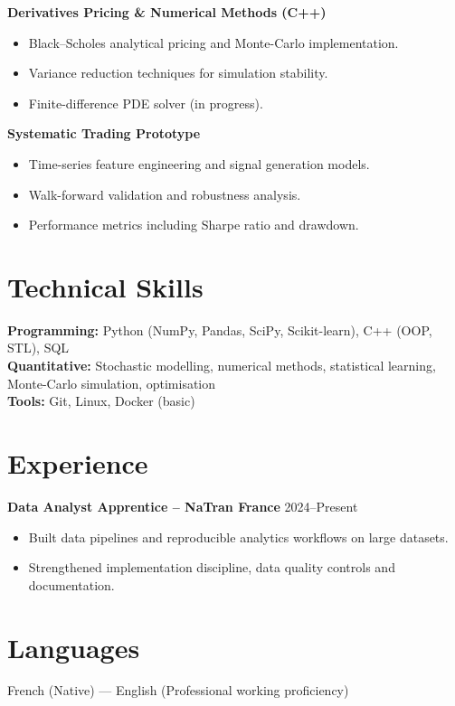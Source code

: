 \documentclass[10pt, letterpaper]{article}
\begin{document}
\textbf{Derivatives Pricing \& Numerical Methods (C++)}
\begin{itemize}[leftmargin=0.5cm]
\item Black--Scholes analytical pricing and Monte-Carlo implementation.
\item Variance reduction techniques for simulation stability.
\item Finite-difference PDE solver (in progress).
\end{itemize}

\textbf{Systematic Trading Prototype}
\begin{itemize}[leftmargin=0.5cm]
\item Time-series feature engineering and signal generation models.
\item Walk-forward validation and robustness analysis.
\item Performance metrics including Sharpe ratio and drawdown.
\end{itemize}

\section*{Technical Skills}
\textbf{Programming:} Python (NumPy, Pandas, SciPy, Scikit-learn), C++ (OOP, STL), SQL\\
\textbf{Quantitative:} Stochastic modelling, numerical methods, statistical learning, Monte-Carlo simulation, optimisation\\
\textbf{Tools:} Git, Linux, Docker (basic)

\section*{Experience}
\textbf{Data Analyst Apprentice -- NaTran France} \hfill 2024--Present
\begin{itemize}[leftmargin=0.5cm]
\item Built data pipelines and reproducible analytics workflows on large datasets.
\item Strengthened implementation discipline, data quality controls and documentation.
\end{itemize}

\section*{Languages}
French (Native) --- English (Professional working proficiency)
\end{document}
